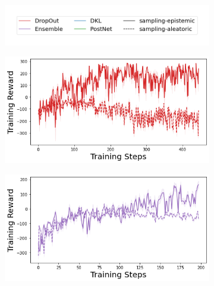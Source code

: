 \begin{figure}
    \centering
    \begin{subfigure}{.45\textwidth}
        \includegraphics[width=\textwidth]{sections/011_icml2022/resources/sampling-legend.png}
    \end{subfigure}
    \vspace{-3mm}
    
    \begin{subfigure}{.245\textwidth}
        \includegraphics[width=\textwidth]{sections/011_icml2022/resources/lunarlander-training_total_reward-dropout-training-strategy.png}
    \end{subfigure}
    \begin{subfigure}{.245\textwidth}
        \includegraphics[width=\textwidth]{sections/011_icml2022/resources/lunarlander-training_total_reward-ensemble-training-strategy.png}
    \end{subfigure}

\end{figure}
